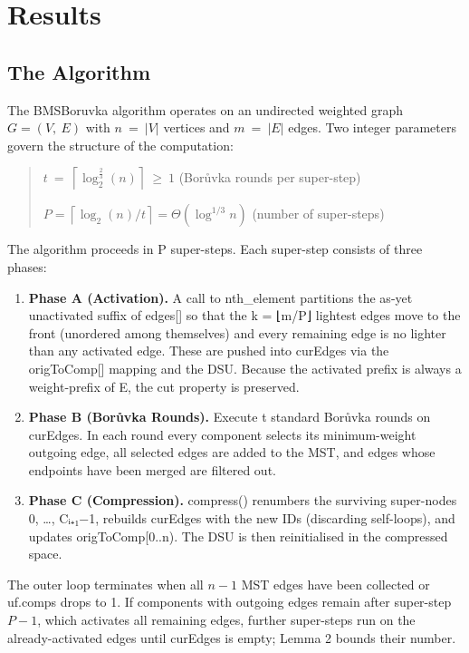 \documentclass[11pt]{article}
\theoremstyle{plain}
\theoremstyle{remark}
\begin{document}
\section{Results}

\subsection{The Algorithm}

The BMSBoruvka algorithm operates on an undirected weighted graph
\(G = (V,\ E)\) with \(n\  = \ |V|\) vertices and \(m\  = \ |E|\) edges.
Two integer parameters govern the structure of the computation:

\begin{quote}
\(t\  = \ \left\lceil \log_{2}^{\frac{2}{3}}(n) \right\rceil\  \geq \ 1\)
(Borůvka rounds per super-step)

\(P = \left\lceil \log_{2}(n)\text{/}t \right\rceil = \Theta\left( \log^{1\text{/}3}n \right)\)
(number of super-steps)
\end{quote}

The algorithm proceeds in P super-steps. Each super-step consists of
three phases:

\begin{enumerate}
\def\labelenumi{\arabic{enumi}.}
\item
  \textbf{Phase A (Activation).} A call to nth\_element partitions the
  as-yet unactivated suffix of edges{[}{]} so that the k = ⌊m/P⌋
  lightest edges move to the front (unordered among themselves) and
  every remaining edge is no lighter than any activated edge. These are
  pushed into curEdges via the origToComp{[}{]} mapping and the DSU. Because the
  activated prefix is always a weight-prefix of E, the cut property is
  preserved.
\item
  \textbf{Phase B (Borůvka Rounds).} Execute t standard Borůvka rounds
  on curEdges. In each round every component selects its minimum-weight
  outgoing edge, all selected edges are added to the MST, and edges
  whose endpoints have been merged are filtered out.
\item
  \textbf{Phase C (Compression).} compress() renumbers the surviving
  super-nodes 0, \ldots, Cᵢ₊₁−1, rebuilds curEdges with the new IDs
  (discarding self-loops), and updates origToComp{[}0..n). The DSU is
  then reinitialised in the compressed space.
\end{enumerate}

The outer loop terminates when all \(n-1\) MST edges have been
collected or uf.comps drops to 1. If components with outgoing edges
remain after super-step \(P-1\), which activates all remaining edges,
further super-steps run on the already-activated edges until curEdges is
empty; Lemma 2 bounds their number.
\end{document}
